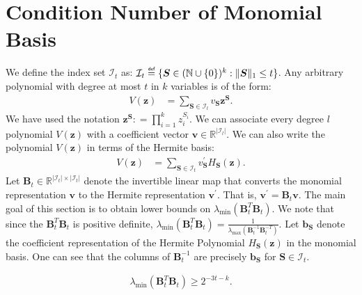 \documentclass[final,12pt]{colt2018} %
\newcommand{\N}{\mathbb{N}}
\newcommand{\R}{\mathbb{R}}
\newcommand{\explain}[2]{\mathrel{\overset{\makebox[0pt]{\mbox{\normalfont\tiny\sffamily #1}}}{#2}}}
\renewcommand\v[1]{{\ensuremath{\boldsymbol{#1}}}}
\newcommand{\lambdamin}[1]{\lambda_{\text{min}} \left( #1 \right)}
\newcommand{\lambdamax}[1]{\lambda_{\text{max}} \left( #1 \right)}
\begin{document}
\section{Condition Number of Monomial Basis}
We define the index set $\mathcal{I}_t$ as: $\mathcal{I}_t \explain{def}{=} \{\v S \in (\N \cup \{0\})^k: \|\v S\|_1 \leq t \}$.
Any arbitrary polynomial with degree at most $t$ in $k$ variables is of the form:
\begin{align*}
    V(\v z) & = \sum_{\v S \in \mathcal{I}_l} v_{\v S} \v z^{\v S}.
\end{align*}
We have used the notation ${\v z}^{\v S}: = \prod_{i=1}^k z_i^{S_i}$. 
We can associate every degree $l$ polynomial $V(\v z)$ with a coefficient vector $\v v \in \R^{|\mathcal{I}_l|}$.  We can also write the polynomial $V(\v z)$ in terms of the Hermite basis:
\begin{align*}
    V(\v z) & = \sum_{{\v S} \in \mathcal{I}_t} v_{\v S}^\prime H_{\v S}(\v z).
\end{align*}
Let $\v B_t \in \R^{|\mathcal{I}_t| \times |\mathcal{I}_t|}$ denote the invertible linear map that converts the monomial representation $\v v$ to the Hermite representation $\v v^\prime$. That is, $\v v^\prime = \v B_t \v v $. The main goal of this section is to obtain lower bounds on $\lambdamin{\v B_t^T\v B_t}$. We note that since the $\v B_t^T \v B_t$ is positive definite, $\lambdamin{\v B_t^T \v B_t}  = \frac{1}{\lambdamax{\v B_t^{-1} \v B_t^{-T}}} $. Let $\v b_{\v S}$ denote the coefficient representation of the Hermite Polynomial $H_{\v S}(\v z)$ in the monomial basis. One can see that the columns of $\v B_t^{-1}$ are precisely $\v b_{\v S}$ for $\v S \in \mathcal{I}_t$.
\begin{lemma} 
\label{lemma: cond_number}
\begin{align*}
    \lambdamin{\v B_t^T \v B_t} \geq 2^{-3t - k}.
\end{align*}
\end{lemma}
\end{document}
